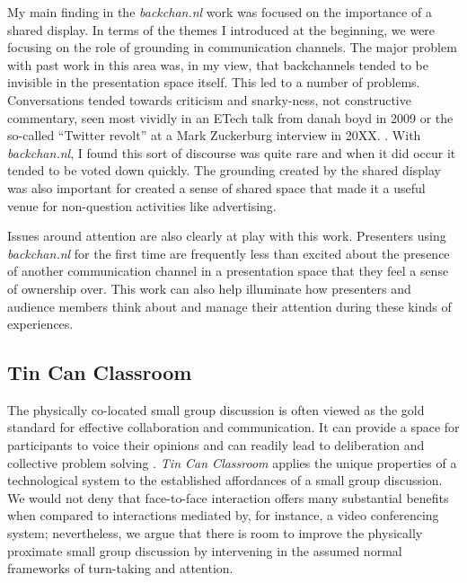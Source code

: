 \documentclass{tufte-handout}
\begin{document}
My main finding in the \emph{backchan.nl} work was focused on the importance of a shared display. In terms of the themes I introduced at the beginning, we were focusing on the role of grounding in communication channels. The major problem with past work in this area was, in my view, that backchannels tended to be invisible in the presentation space itself. This led to a number of problems. Conversations tended towards criticism and snarky-ness, not constructive commentary, seen most vividly in an ETech talk from danah boyd in 2009 \citet{danah_etech_commentary} or the so-called ``Twitter revolt'' at a Mark Zuckerburg interview in 20XX. \citet{figure_this_out}. With \emph{backchan.nl}, I found this sort of discourse was quite rare and when it did occur it tended to be voted down quickly. The grounding created by the shared display was also important for created a sense of shared space that made it a useful venue for non-question activities like advertising. 

Issues around attention are also clearly at play with this work. Presenters using \emph{backchan.nl} for the first time are frequently less than excited about the presence of another communication channel in a presentation space that they feel a sense of ownership over. This work can also help illuminate how presenters and audience members think about and manage their attention during these kinds of experiences.



\subsection{Tin Can Classroom}


The physically co-located small group discussion is often viewed as the gold standard for effective collaboration and communication.  It can provide a space for participants to voice their opinions and can readily lead to deliberation and collective problem solving \citet{Burkhalter:2002vg}. \emph{Tin Can Classroom}  applies the unique properties of a technological system to the established affordances of a small group discussion. We would not deny that face-to-face interaction offers many substantial benefits when compared to interactions mediated by, for instance, a video conferencing system; nevertheless, we argue that there is room to improve the physically proximate small group discussion by intervening in the assumed normal frameworks of turn-taking and attention.
\end{document}
